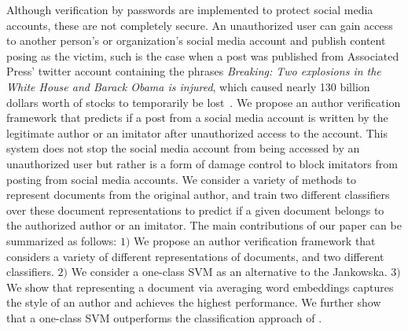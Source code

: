 \documentclass[11pt]{article}
\begin{document}
Although verification by passwords are implemented to protect social media accounts, these are not completely secure. An unauthorized user can gain access to another person's or organization's social media account and publish content posing as the victim, such is the case when a post was published from Associated Press' twitter account containing the phrases \textit{Breaking: Two explosions in the White House and Barack Obama is injured}, which caused nearly 130 billion dollars worth of stocks to temporarily be lost~\cite{financialTimes}. We propose an author verification framework that predicts if a post from a social media account is written by the legitimate author or an imitator after unauthorized access to the account. This system does not stop the social media account from being accessed by an unauthorized user but rather is a form of damage control to block imitators from posting from social media accounts. We consider a variety of methods to represent documents from the original author, and train two different classifiers over these document representations to predict if a given document belongs to the authorized author or an imitator. The main contributions of our paper can be summarized as follows: $1)$ We propose an author verification framework that considers a variety of different representations of documents, and two different classifiers. $2)$ We consider a one-class SVM as an alternative to the Jankowska. $3)$ We show that representing a document via averaging word embeddings captures the style of an author and achieves the highest performance. We further show that a one-class SVM outperforms the classification approach of \cite{jankowska2014}.
\end{document}
